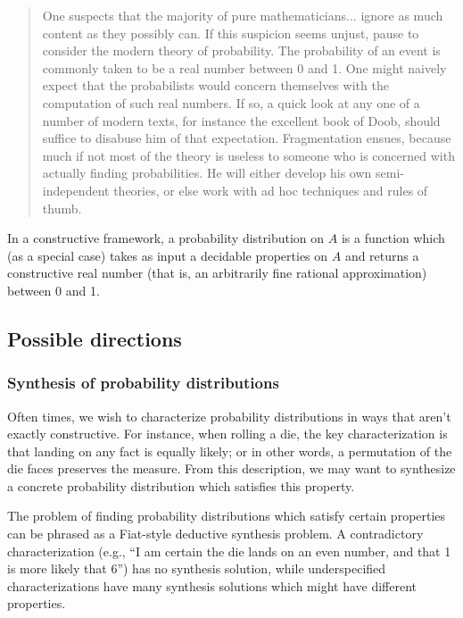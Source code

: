 \begin{quote}
One suspects that the majority of pure mathematicians... ignore as much content as they possibly can. If this suspicion seems unjust, pause to consider the modern theory of probability. The probability of an event is commonly taken to be a real number between 0 and 1. One might naively expect that the probabilists would concern themselves with the computation of such real numbers. If so, a quick look at any one of a number of modern texts, for instance the excellent book of Doob, should suffice to disabuse him of that expectation. Fragmentation ensues, because much if not most of the theory is useless to someone who is concerned with actually finding probabilities. He will either develop his own semi-independent theories, or else work with ad hoc techniques and rules of thumb.
\end{quote}

In a constructive framework, a probability distribution on $A$ is a function which (as a special case) takes as input a decidable properties on $A$ and returns a constructive real number (that is, an arbitrarily fine rational approximation) between 0 and 1. 

\subsection{Possible directions}

\subsubsection{Synthesis of probability distributions}

Often times, we wish to characterize probability distributions in ways that aren't exactly constructive. For instance, when rolling a die, the key characterization is that landing on any fact is equally likely; or in other words, a permutation of the die faces preserves the measure. From this description, we may want to synthesize a concrete probability distribution which satisfies this property.

The problem of finding probability distributions which satisfy certain properties can be phrased as a Fiat-style deductive synthesis problem. A contradictory characterization (e.g., ``I am certain the die lands on an even number, and that 1 is more likely that 6'') has no synthesis solution, while underspecified characterizations have many synthesis solutions which might have different properties.

